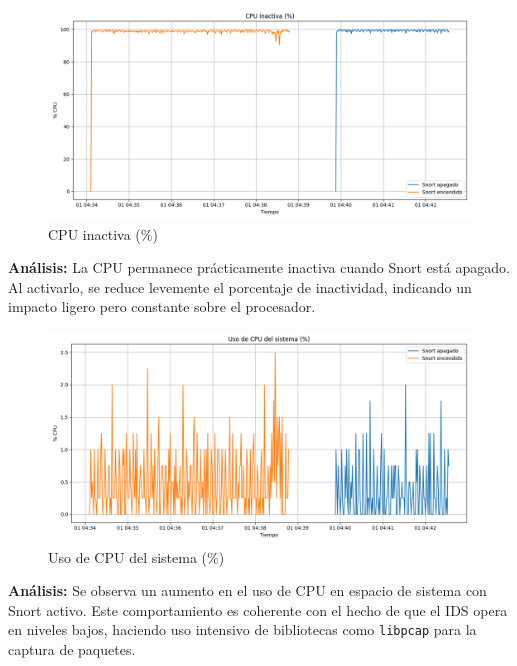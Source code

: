 \documentclass[12pt,a4paper]{report}
\begin{document}
\begin{figure}[H]
	\centering
	\includegraphics[width=\textwidth]{graficas/cpu_idle.png}
	\caption{CPU inactiva (\%)}
\end{figure}
\textbf{Análisis:} La CPU permanece prácticamente inactiva cuando Snort está apagado. Al activarlo, se reduce levemente el porcentaje de inactividad, indicando un impacto ligero pero constante sobre el procesador.

\begin{figure}[H]
	\centering
	\includegraphics[width=\textwidth]{graficas/cpu_sys.png}
	\caption{Uso de CPU del sistema (\%)}
\end{figure}
\textbf{Análisis:} Se observa un aumento en el uso de CPU en espacio de sistema con Snort activo. Este comportamiento es coherente con el hecho de que el IDS opera en niveles bajos, haciendo uso intensivo de bibliotecas como \texttt{libpcap} para la captura de paquetes.
\end{document}
